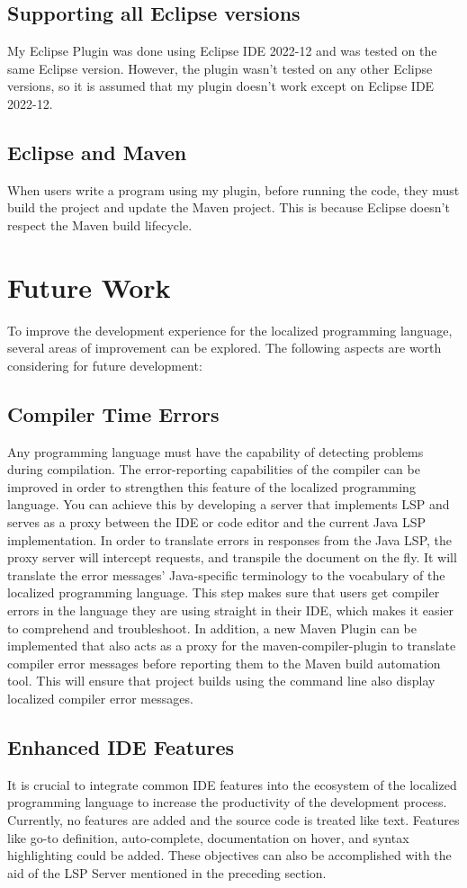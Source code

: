 \subsection{Supporting all Eclipse versions}
My Eclipse Plugin was done using Eclipse IDE 2022-12 and was tested on the same Eclipse version. However, the plugin wasn't tested on any other Eclipse versions, so it is assumed that my plugin doesn't work except on Eclipse IDE 2022-12.
\subsection{Eclipse and Maven}
When users write a program using my plugin, before running the code, they must build the project and update the Maven project. This is because Eclipse doesn't respect the Maven build lifecycle.
\section{Future Work}
To improve the development experience for the localized programming language, several areas of improvement can be explored. The following aspects are worth considering for future development:
\subsection{Compiler Time Errors}
Any programming language must have the capability of detecting problems during compilation. The error-reporting capabilities of the compiler can be improved in order to strengthen this feature of the localized programming language. You can achieve this by developing a server that implements \ac{LSP} and serves as a proxy between the IDE or code editor and the current Java LSP implementation. In order to translate errors in responses from the Java LSP, the proxy server will intercept requests, and transpile the document on the fly. It will translate the error messages' Java-specific terminology to the vocabulary of the localized programming language. This step makes sure that users get compiler errors in the language they are using straight in their IDE, which makes it easier to comprehend and troubleshoot. In addition, a new Maven Plugin can be implemented that also acts as a proxy for the maven-compiler-plugin to translate compiler error messages before reporting them to the Maven build automation tool. This will ensure that project builds using the command line also display localized compiler error messages.
\subsection{Enhanced IDE Features}
It is crucial to integrate common IDE features into the ecosystem of the localized programming language to increase the productivity of the development process. Currently, no features are added and the source code is treated like text. Features like go-to definition, auto-complete, documentation on hover, and syntax highlighting could be added. These objectives can also be accomplished with the aid of the LSP Server mentioned in the preceding section.
